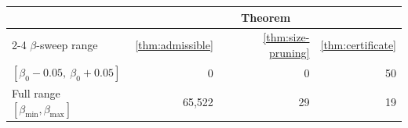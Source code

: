 \begin{table}[t]
\centering
\label{tab:solve-exact-theorem-invocations}
\begin{tabular}{l rrr}
\toprule
& \multicolumn{3}{c}{Theorem} \\
\cmidrule(lr){2-4}
$\beta$-sweep range & \ref{thm:admissible} & \ref{thm:size-pruning} & \ref{thm:certificate} \\
\midrule
$[\beta_0 - 0.05,\ \beta_0 + 0.05]$ & 0 & 0 & 50 \\
Full range $[\beta_{\min}, \beta_{\max}]$ & 65{,}522 & 29 & 19 \\
\bottomrule
\end{tabular}
\end{table}
